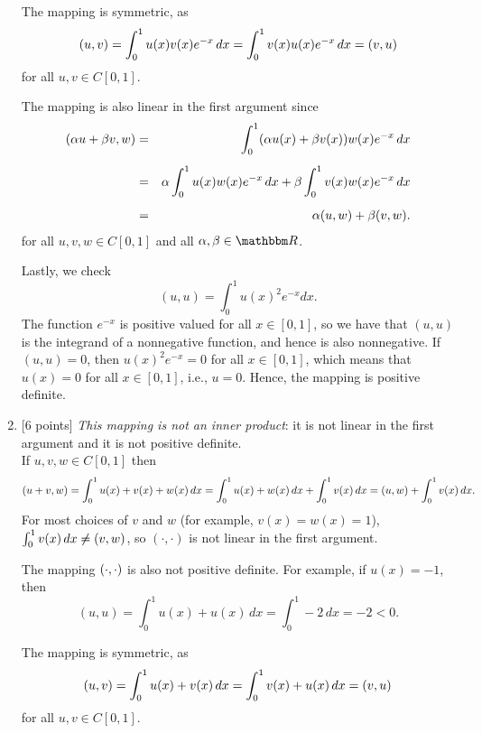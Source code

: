 \begin{solution}
\begin{enumerate}
     The mapping is symmetric, as 
     \[ (u,v) = \int_0^1 u(x) v(x) e^{-x}\, d x
                 =  \int_0^1 v(x) u(x) e^{-x} \, d x = (v,u)\]
for all $u,v\in C[0,1]$.

     The mapping is also linear in the first argument since
     \begin{eqnarray*}
      (\alpha u + \beta v, w) &=& \int_0^1 (\alpha u(x) + \beta v(x)) w(x) e^{-x}\, d x \\[0.5em]
                 &=&  \alpha \int_0^1 u(x)w(x) e^{-x}\, dx
                   +  \beta \int_0^1 v(x)w(x) e^{-x}\, dx \\[0.5em]
                 &=& \alpha (u,w) + \beta (v,w).
     \end{eqnarray*}
for all $u,v,w\in C[0,1]$ and all $\alpha,\beta\in\R$.

      Lastly, we check
          \[ (u,u) = \int_0^1 u(x)^2 e^{-x} d x.\]
      The function $e^{-x}$ is positive valued for all $x\in[0,1]$, so we have 
      that $(u,u)$ is the integrand of a nonnegative function, and hence
      is also nonnegative.  If $(u,u) = 0$, then $u(x)^2 e^{-x} = 0$ for all $x\in[0,1]$,
      which means that $u(x)=0$ for all $x\in[0,1]$, i.e., $u=0$. Hence, the mapping is positive definite.
     
\item {[6 points]} \emph{This mapping is not an inner product}: 
      it is not linear in the first argument and it is not positive definite.\\

       If $u,v,w\in C[0,1]$ then
         \[ (u + v, w) 
                = \int_0^1 u(x)+v(x) + w(x) \,dx 
                = \int_0^1 u(x) + w(x) \,dx 
                   + \int_0^1 v(x)\,dx
                = (u,w) + \int_0^1 v(x)\,dx.\]
        For most choices of $v$ and $w$ (for example, $v(x)=w(x)=1$), 
        $\int_0^1 v(x) \,dx \ne (v,w)$, so $(\cdot,\cdot)$ is not linear in the first argument.

      The mapping $(\cdot,\cdot)$ is also not positive definite. For example, if $u(x) = -1$,  then
         \[ (u,u) = \int_0^1 u(x)+ u(x) \, dx = \int_0^1 -2\, dx = -2 < 0.\]
      
     The mapping is symmetric, as 
     \[ (u,v) = \int_0^1 u(x)+v(x) \, d x
                 =  \int_0^1 v(x)+u(x)  \, d x = (v,u)\]
for all $u,v\in C[0,1]$.

\end{enumerate}
\end{solution}